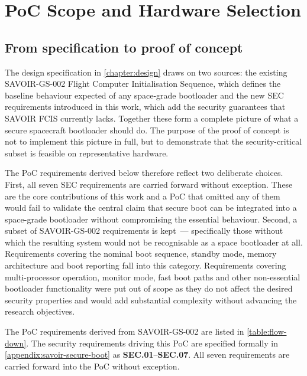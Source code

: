 \chapter{PoC Scope and Hardware Selection}
\label{chapter:hw}

\section{From specification to proof of concept}
\label{section:hw-scope}

The design specification in \autoref{chapter:design} draws on two sources: the existing SAVOIR-GS-002 Flight Computer Initialisation Sequence, which defines the baseline behaviour expected of any space-grade bootloader and the new SEC requirements introduced in this work, which add the security guarantees that SAVOIR FCIS currently lacks. Together these form a complete picture of what a secure spacecraft bootloader should do. The purpose of the proof of concept is not to implement this picture in full, but to demonstrate that the security-critical subset is feasible on representative hardware.

The PoC requirements derived below therefore reflect two deliberate choices. First, all seven SEC requirements are carried forward without exception. These are the core contributions of this work and a PoC that omitted any of them would fail to validate the central claim that secure boot can be integrated into a space-grade bootloader without compromising the essential behaviour. Second, a subset of SAVOIR-GS-002 requirements is kept~--- specifically those without which the resulting system would not be recognisable as a space bootloader at all. Requirements covering the nominal boot sequence, standby mode, memory architecture and boot reporting fall into this category. Requirements covering multi-processor operation, monitor mode, fast boot paths and other non-essential bootloader functionality were put out of scope as they do not affect the desired security properties and would add substantial complexity without advancing the research objectives.

The PoC requirements derived from SAVOIR-GS-002 are listed in \autoref{table:flow-down}. The security requirements driving this PoC are specified formally in \autoref{appendix:savoir-secure-boot} as \textbf{SEC.01}--\textbf{SEC.07}. All seven requirements are carried forward into the PoC without exception.

